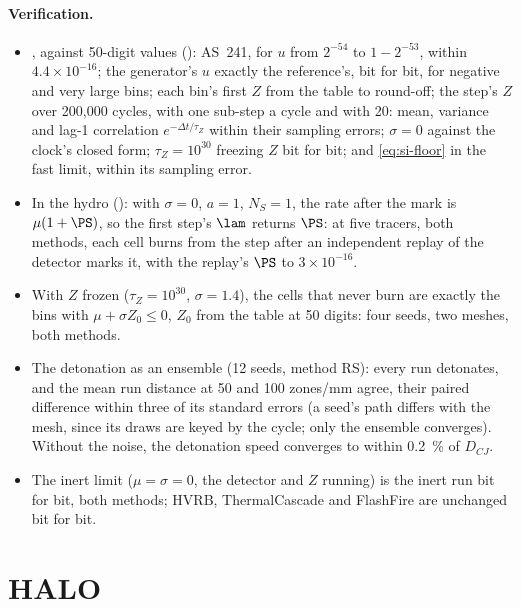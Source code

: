 \paragraph{Verification.}
\begin{itemize}
\item {}, against 50-digit values ():
  AS~241, for $u$ from $2^{-54}$ to $1 - 2^{-53}$, within $4.4\times10^{-16}$; the
  generator's $u$ exactly the reference's, bit for bit, for negative and
  very large bins; each bin's first $Z$ from the table to round-off; the
  step's $Z$ over 200,000 cycles, with one sub-step a cycle and with 20:
  mean, variance and lag-1 correlation $e^{-\Delta t/\tau_Z}$ within their
  sampling errors; $\sigma = 0$ against the clock's closed form; $\tau_Z =
  10^{30}$ freezing $Z$ bit for bit; and \cref{eq:si-floor} in the fast
  limit, within its sampling error.
\item In the hydro (): with $\sigma =
  0$, $a = 1$, $N_S = 1$, the rate after the mark is $\mu(1 + \PS)$, so the
  first step's $\lam$ returns $\PS$: at five tracers, both methods, each cell
  burns from the step after an independent replay of the detector marks it,
  with the replay's $\PS$ to $3\times10^{-16}$.
\item With $Z$ frozen ($\tau_Z = 10^{30}$, $\sigma = 1.4$), the cells that
  never burn are exactly the bins with $\mu + \sigma Z_0 \le 0$, $Z_0$ from
  the table at 50 digits: four seeds, two meshes, both methods.
\item The detonation as an ensemble (12 seeds, method RS): every run
  detonates, and the mean run distance at 50 and 100 zones/mm agree, their
  paired difference within three of its standard errors (a seed's path
  differs with the mesh, since its draws are keyed by the cycle; only the
  ensemble converges). Without the
  noise, the detonation speed converges to within 0.2~\% of $D_{CJ}$.
\item The inert limit ($\mu = \sigma = 0$, the detector and $Z$ running) is
  the inert run bit for bit, both methods; HVRB, ThermalCascade and FlashFire
  are unchanged bit for bit.
\end{itemize}

\section{HALO}
\label{sec:halo}

